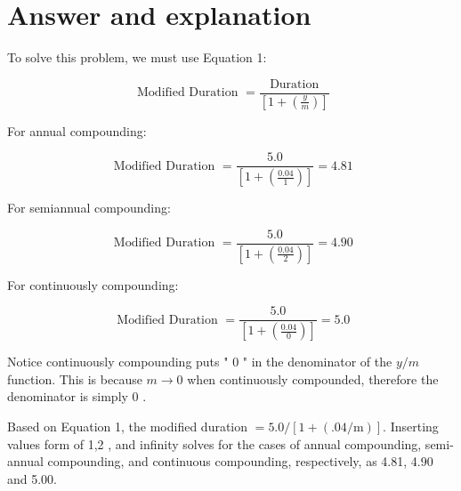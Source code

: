 \documentclass[11pt]{article}
\begin{document}
\section*{Answer and explanation}
To solve this problem, we must use Equation 1:

$$
\text { Modified Duration }=\frac{\text { Duration }}{\left[1+\left(\frac{y}{m}\right)\right]}
$$

For annual compounding:

$$
\text { Modified Duration }=\frac{5.0}{\left[1+\left(\frac{0.04}{1}\right)\right]}=4.81
$$

For semiannual compounding:

$$
\text { Modified Duration }=\frac{5.0}{\left[1+\left(\frac{0.04}{2}\right)\right]}=4.90
$$

For continuously compounding:

$$
\text { Modified Duration }=\frac{5.0}{\left[1+\left(\frac{0.04}{0}\right)\right]}=5.0
$$

Notice continuously compounding puts " 0 " in the denominator of the $y / m$ function. This is because $m \rightarrow 0$ when continuously compounded, therefore the denominator is simply 0 .

Based on Equation 1, the modified duration $=5.0 /[1+(.04 / \mathrm{m})]$. Inserting values form of 1,2 , and infinity solves for the cases of annual compounding, semi-annual compounding, and continuous compounding, respectively, as 4.81, 4.90 and 5.00.
\end{document}
